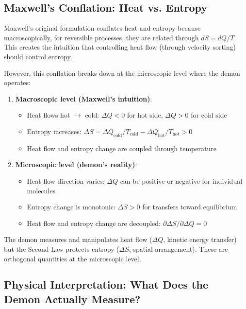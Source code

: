 \documentclass[10pt,twocolumn,letterpaper]{article}
\theoremstyle{definition}
\theoremstyle{remark}
\begin{document}
\subsection{Maxwell's Conflation: Heat vs. Entropy}

Maxwell's original formulation conflates heat and entropy because macroscopically, for reversible processes, they are related through $dS = dQ/T$. This creates the intuition that controlling heat flow (through velocity sorting) should control entropy.

However, this conflation breaks down at the microscopic level where the demon operates:

\begin{enumerate}
\item \textbf{Macroscopic level (Maxwell's intuition)}:
\begin{itemize}
\item Heat flows hot $\to$ cold: $\Delta Q < 0$ for hot side, $\Delta Q > 0$ for cold side
\item Entropy increases: $\Delta S = \Delta Q_{\text{cold}}/T_{\text{cold}} - \Delta Q_{\text{hot}}/T_{\text{hot}} > 0$
\item Heat flow and entropy change are coupled through temperature
\end{itemize}

\item \textbf{Microscopic level (demon's reality)}:
\begin{itemize}
\item Heat flow direction varies: $\Delta Q$ can be positive or negative for individual molecules
\item Entropy change is monotonic: $\Delta S > 0$ for transfers toward equilibrium
\item Heat flow and entropy change are decoupled: $\partial \Delta S/\partial \Delta Q = 0$
\end{itemize}
\end{enumerate}

The demon measures and manipulates heat flow ($\Delta Q$, kinetic energy transfer) but the Second Law protects entropy ($\Delta S$, spatial arrangement). These are orthogonal quantities at the microscopic level.

\subsection{Physical Interpretation: What Does the Demon Actually Measure?}
\end{document}
